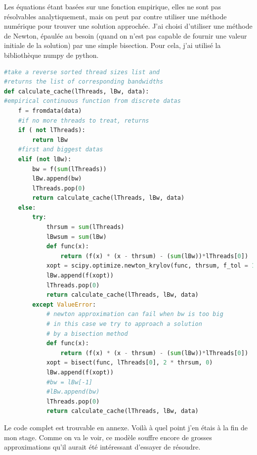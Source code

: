 \documentclass{report}
\begin{document}
Les équations étant basées sur une fonction empirique, elles ne sont pas résolvables analytiquement, 
mais on peut par contre utiliser une méthode numérique pour trouver une solution approchée. J'ai 
choisi d'utiliser une méthode de Newton, épaulée au besoin (quand on n'est pas capable de fournir 
une valeur initiale de la solution) par une simple bisection. Pour cela, j'ai utilisé la 
bibliothèque numpy de python. 
\begin{lstlisting}[language=python]
#take a reverse sorted thread sizes list and 
#returns the list of corresponding bandwidths
def calculate_cache(lThreads, lBw, data):
#empirical continuous function from discrete datas
    f = fromdata(data)
    #if no more threads to treat, returns
    if ( not lThreads):
        return lBw
    #first and biggest datas
    elif (not lBw):
        bw = f(sum(lThreads))
        lBw.append(bw)
        lThreads.pop(0)
        return calculate_cache(lThreads, lBw, data)
    else:
        try:
            thrsum = sum(lThreads)
            lBwsum = sum(lBw)
            def func(x):
                return (f(x) * (x - thrsum) - (sum(lBw))*lThreads[0])
            xopt = scipy.optimize.newton_krylov(func, thrsum, f_tol = 1.0)
            lBw.append(f(xopt))
            lThreads.pop(0)
            return calculate_cache(lThreads, lBw, data)
        except ValueError:
            # newton approximation can fail when bw is too big
            # in this case we try to approach a solution
            # by a bisection method
            def func(x):
                return (f(x) * (x - thrsum) - (sum(lBw))*lThreads[0])
            xopt = bisect(func, lThreads[0], 2 * thrsum, 0)
            lBw.append(f(xopt))
            #bw = lBw[-1]
            #lBw.append(bw)
            lThreads.pop(0)
            return calculate_cache(lThreads, lBw, data)

\end{lstlisting}
Le code complet est trouvable en annexe. Voilà à quel point j'en étais à la fin de mon stage.
Comme on va le voir, ce modèle souffre encore de grosses approximations qu'il aurait été intéressant
d'essayer de résoudre.
\end{document}
